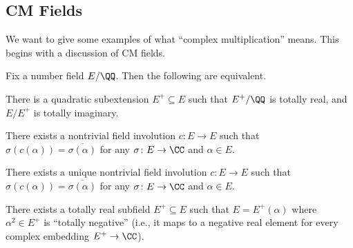 \documentclass[../notes.tex]{subfiles}
\begin{document}
\subsection{CM Fields}
We want to give some examples of what ``complex multiplication'' means. This begins with a discussion of CM fields.
\begin{lemma} \label{lem:how-to-cm}
	Fix a number field $E/\QQ$. Then the following are equivalent.
	\begin{listroman}
		\item There is a quadratic subextension $E^+\subseteq E$ such that $E^+/\QQ$ is totally real, and $E/E^+$ is totally imaginary.
		\item There exists a nontrivial field involution $c\colon E\to E$ such that $\sigma(c(\alpha))=\overline{\sigma(\alpha)}$ for any $\sigma\colon E\to\CC$ and $\alpha\in E$.
		\item There exists a unique nontrivial field involution $c\colon E\to E$ such that $\sigma(c(\alpha))=\overline{\sigma(\alpha)}$ for any $\sigma\colon E\to\CC$ and $\alpha\in E$.
		\item There exists a totally real subfield $E^+\subseteq E$ such that $E=E^+(\alpha)$ where $\alpha^2\in E^+$ is ``totally negative'' (i.e., it maps to a negative real element for every complex embedding $E^+\to\CC$).
	\end{listroman}
\end{lemma}
\end{document}

